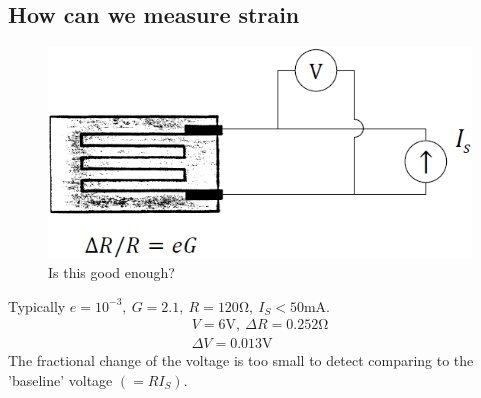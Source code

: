 \documentclass[class=report, crop=false, 12pt,a4paper, tikz, border=4mm]{standalone}
\begin{document}
\subsection{How can we measure strain}
\begin{figure}[H]
  \centering
  \includegraphics[width = 0.8 \textwidth]{../img/diagram11.png}
  \caption{Is this good enough?}
\end{figure}
Typically $e = 10^{-3}, \ G = 2.1, \ R = 120 \si{\ohm}, \ I_S < 50 \si{\milli \ampere}$.
\begin{gather}
  V = 6 \si{\volt}, \ \Delta R = 0.252 \si{\ohm}\\
  \Delta V = 0.013 \si{\volt}
\end{gather}
The fractional change of the voltage is too small to detect comparing to the 'baseline' voltage $(=RI_S)$.
\end{document}
